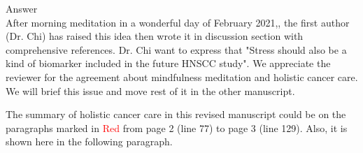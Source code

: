 \documentclass[preprint,12pt]{elsarticle}
\newenvironment{MyColorPar}[1]{%
    \leavevmode\color{#1}\ignorespaces%
}{%
}%
\begin{document}

\begin{MyColorPar}{blue}
Answer\\
After morning meditation in a wonderful day of February 2021,, the first author (Dr. Chi) has raised this idea then wrote it in discussion section with comprehensive references. Dr. Chi want to express that "Stress should also be a kind of biomarker included in the future HNSCC study".
We appreciate the reviewer for the agreement about mindfulness meditation and holistic cancer care. We will brief this issue and move rest of it in the other manuscript.

The summary of holistic cancer care in this revised manuscript could be on the paragraphs marked in \textcolor{red}{Red} from page 2 (line 77) to page 3 (line 129). Also, it is shown here in the following paragraph.



\end{MyColorPar}
\end{document}
